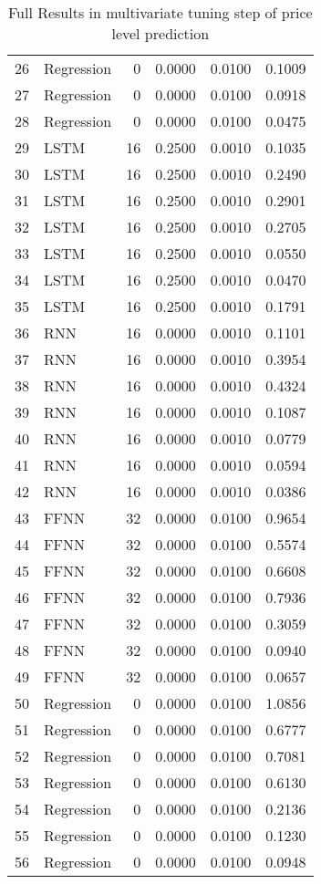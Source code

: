 \begin{table}[ht]
\begin{tabular}{rlrrrr}
  26 & Regression &     0 & 0.0000 & 0.0100 & 0.1009 \\ 
  27 & Regression &     0 & 0.0000 & 0.0100 & 0.0918 \\ 
  28 & Regression &     0 & 0.0000 & 0.0100 & 0.0475 \\ 
  29 & LSTM &    16 & 0.2500 & 0.0010 & 0.1035 \\ 
  30 & LSTM &    16 & 0.2500 & 0.0010 & 0.2490 \\ 
  31 & LSTM &    16 & 0.2500 & 0.0010 & 0.2901 \\ 
  32 & LSTM &    16 & 0.2500 & 0.0010 & 0.2705 \\ 
  33 & LSTM &    16 & 0.2500 & 0.0010 & 0.0550 \\ 
  34 & LSTM &    16 & 0.2500 & 0.0010 & 0.0470 \\ 
  35 & LSTM &    16 & 0.2500 & 0.0010 & 0.1791 \\ 
  36 & RNN &    16 & 0.0000 & 0.0010 & 0.1101 \\ 
  37 & RNN &    16 & 0.0000 & 0.0010 & 0.3954 \\ 
  38 & RNN &    16 & 0.0000 & 0.0010 & 0.4324 \\ 
  39 & RNN &    16 & 0.0000 & 0.0010 & 0.1087 \\ 
  40 & RNN &    16 & 0.0000 & 0.0010 & 0.0779 \\ 
  41 & RNN &    16 & 0.0000 & 0.0010 & 0.0594 \\ 
  42 & RNN &    16 & 0.0000 & 0.0010 & 0.0386 \\ 
  43 & FFNN &    32 & 0.0000 & 0.0100 & 0.9654 \\ 
  44 & FFNN &    32 & 0.0000 & 0.0100 & 0.5574 \\ 
  45 & FFNN &    32 & 0.0000 & 0.0100 & 0.6608 \\ 
  46 & FFNN &    32 & 0.0000 & 0.0100 & 0.7936 \\ 
  47 & FFNN &    32 & 0.0000 & 0.0100 & 0.3059 \\ 
  48 & FFNN &    32 & 0.0000 & 0.0100 & 0.0940 \\ 
  49 & FFNN &    32 & 0.0000 & 0.0100 & 0.0657 \\ 
  50 & Regression &     0 & 0.0000 & 0.0100 & 1.0856 \\ 
  51 & Regression &     0 & 0.0000 & 0.0100 & 0.6777 \\ 
  52 & Regression &     0 & 0.0000 & 0.0100 & 0.7081 \\ 
  53 & Regression &     0 & 0.0000 & 0.0100 & 0.6130 \\ 
  54 & Regression &     0 & 0.0000 & 0.0100 & 0.2136 \\ 
  55 & Regression &     0 & 0.0000 & 0.0100 & 0.1230 \\ 
  56 & Regression &     0 & 0.0000 & 0.0100 & 0.0948 \\ 
   \hline
\end{tabular}
\caption{Full Results in multivariate tuning step of price level prediction} 
\label{tab:level.multivar.par.tuning.full}
\end{table}
